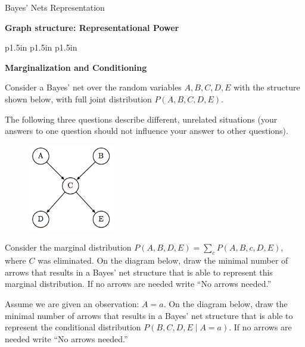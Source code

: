 \begin{problem}{Bayes' Nets Representation}
\begin{question}[]{\bf Graph structure: Representational Power}
\begin{subquestion}[6]
\begin{table}[h!]
\hfill
\begin{tabular}{ p{1.5in} p{1.5in} p{1.5in} }
\OneAii
\end{tabular}
\hfill
\end{table}
\end{subquestion}

\end{question}

\newpage
\begin{question}[]{\bf Marginalization and Conditioning}

Consider a  Bayes' net over the random variables $A, B, C, D, E$ with
the structure shown below, with full joint distribution $P(A,B,C,D,E)$.

The following three questions describe different, unrelated situations (your answers to one question should not influence your answer to other questions).


\begin{figure}[h!]
\centering
  \includegraphics[height=1.5in]{figures/bayes_marg_q1}
\end{figure}

\begin{subquestion}[6]
Consider the marginal distribution $P(A, B, D, E) = \sum_c P(A, B, c, D, E)$,
where $C$ was eliminated.
On the diagram below, draw the minimal number of arrows that results
in a Bayes' net structure that is able to represent this marginal
distribution.  If no arrows are needed write ``No arrows needed.'' \\

\begin{minipage}[c]{\linewidth}
    \centering
    \OneBi
    \vspace{.25in}
  \end{minipage}

\end{subquestion}

\begin{subquestion}[6]
Assume we are given an observation: $A=a$.
On the diagram below, draw the minimal number of arrows that results
in a Bayes' net structure that is able to represent the conditional distribution $P(B,C,D,E \mid A=a)$.
 If no arrows are needed write ``No arrows needed.'' \\


\end{subquestion}
\end{question}
\end{problem}
